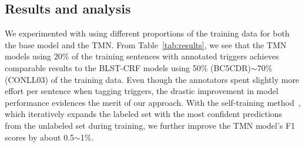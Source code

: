 
\subsection{Results and analysis}
We experimented with using different proportions of the training data for both the base model and the TMN.
From Table~\ref{tab:results}, we see that the TMN models using 20\% of the training sentences with annotated triggers achieves comparable results to the BLST-CRF models using 50\% (BC5CDR)$\sim$70\% (CONLL03) of the training data.
Even though the annotators spent slightly more effort per sentence when tagging triggers, the drastic improvement in model performance evidences the merit of our approach.
With the self-training method~\citep{Rosenberg2005SemiSupervisedSO}, which iteratively expands the labeled set with the most confident predictions from the unlabeled set during training, we further improve the TMN model's F1 scores by about 0.5$\sim$1\%. 

